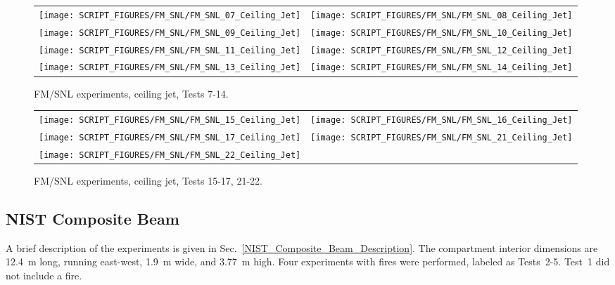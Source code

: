 \newpage

\begin{figure}[p]
\begin{tabular*}{\textwidth}{l@{\extracolsep{\fill}}r}
\texttt{[image: SCRIPT\_FIGURES/FM\_SNL/FM\_SNL\_07\_Ceiling\_Jet]} &
\texttt{[image: SCRIPT\_FIGURES/FM\_SNL/FM\_SNL\_08\_Ceiling\_Jet]} \\
\texttt{[image: SCRIPT\_FIGURES/FM\_SNL/FM\_SNL\_09\_Ceiling\_Jet]} &
\texttt{[image: SCRIPT\_FIGURES/FM\_SNL/FM\_SNL\_10\_Ceiling\_Jet]} \\
\texttt{[image: SCRIPT\_FIGURES/FM\_SNL/FM\_SNL\_11\_Ceiling\_Jet]} &
\texttt{[image: SCRIPT\_FIGURES/FM\_SNL/FM\_SNL\_12\_Ceiling\_Jet]} \\
\texttt{[image: SCRIPT\_FIGURES/FM\_SNL/FM\_SNL\_13\_Ceiling\_Jet]} &
\texttt{[image: SCRIPT\_FIGURES/FM\_SNL/FM\_SNL\_14\_Ceiling\_Jet]} \\
\end{tabular*}
\caption[FM/SNL experiments, ceiling jet, Tests 7-14]
{FM/SNL experiments, ceiling jet, Tests 7-14.}
\label{FM_SNL_Ceiling_Jet_2}
\end{figure}

\begin{figure}[p]
\begin{tabular*}{\textwidth}{l@{\extracolsep{\fill}}r}
\texttt{[image: SCRIPT\_FIGURES/FM\_SNL/FM\_SNL\_15\_Ceiling\_Jet]} &
\texttt{[image: SCRIPT\_FIGURES/FM\_SNL/FM\_SNL\_16\_Ceiling\_Jet]} \\
\texttt{[image: SCRIPT\_FIGURES/FM\_SNL/FM\_SNL\_17\_Ceiling\_Jet]} &
\texttt{[image: SCRIPT\_FIGURES/FM\_SNL/FM\_SNL\_21\_Ceiling\_Jet]} \\
\texttt{[image: SCRIPT\_FIGURES/FM\_SNL/FM\_SNL\_22\_Ceiling\_Jet]} \\
\end{tabular*}
\caption[FM/SNL experiments, ceiling jet, Tests 15-17, 21-22]
{FM/SNL experiments, ceiling jet, Tests 15-17, 21-22.}
\label{FM_SNL_Ceiling_Jet_3}
\end{figure}



\clearpage

\subsection{NIST Composite Beam}

A brief description of the experiments is given in Sec.~\ref{NIST_Composite_Beam_Description}. The compartment interior dimensions are 12.4~m long, running east-west, 1.9~m wide, and 3.77~m high. Four experiments with fires were performed, labeled as Tests~2-5. Test~1 did not include a fire.

